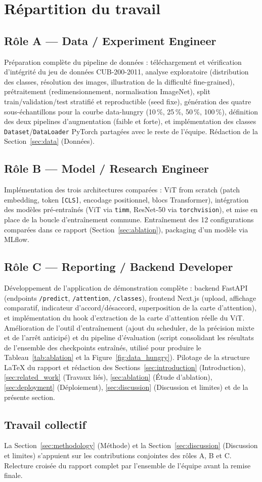 \section{Répartition du travail}
\label{sec:contributions}

\subsection{Rôle A — Data / Experiment Engineer}

Préparation complète du pipeline de données : téléchargement et
vérification d'intégrité du jeu de données CUB-200-2011, analyse
exploratoire (distribution des classes, résolution des images,
illustration de la difficulté fine-grained), prétraitement
(redimensionnement, normalisation ImageNet), split train/validation/test
stratifié et reproductible (seed fixe), génération des quatre
sous-échantillons pour la courbe data-hungry (10\,\%, 25\,\%, 50\,\%,
100\,\%), définition des deux pipelines d'augmentation (faible et
forte), et implémentation des classes \texttt{Dataset}/\texttt{DataLoader}
PyTorch partagées avec le reste de l'équipe. Rédaction de la
Section~\ref{sec:data} (Données).

\subsection{Rôle B — Model / Research Engineer}

Implémentation des trois architectures comparées : ViT from scratch
(patch embedding, token \texttt{[CLS]}, encodage positionnel, blocs
Transformer), intégration des modèles pré-entraînés (ViT via
\texttt{timm}, ResNet-50 via \texttt{torchvision}), et mise en place de
la boucle d'entraînement commune. Entraînement des 12 configurations
comparées dans ce rapport (Section~\ref{sec:ablation}), packaging d'un
modèle via MLflow.

\subsection{Rôle C — Reporting / Backend Developer}

Développement de l'application de démonstration complète : backend
FastAPI (endpoints \texttt{/predict}, \texttt{/attention},
\texttt{/classes}), frontend Next.js (upload, affichage comparatif,
indicateur d'accord/désaccord, superposition de la carte d'attention),
et implémentation du hook d'extraction de la carte d'attention réelle du
ViT. Amélioration de l'outil d'entraînement (ajout du scheduler, de la
précision mixte et de l'arrêt anticipé) et du pipeline d'évaluation
(script consolidant les résultats de l'ensemble des checkpoints
entraînés, utilisé pour produire le Tableau~\ref{tab:ablation} et la
Figure~\ref{fig:data_hungry}). Pilotage de la structure LaTeX du
rapport et rédaction des Sections~\ref{sec:introduction}
(Introduction), \ref{sec:related_work} (Travaux liés),
\ref{sec:ablation} (Étude d'ablation), \ref{sec:deployment}
(Déploiement), \ref{sec:discussion} (Discussion et limites) et de la
présente section.

\subsection{Travail collectif}

La Section~\ref{sec:methodology} (Méthode) et la
Section~\ref{sec:discussion} (Discussion et limites) s'appuient sur les
contributions conjointes des rôles A, B et C. Relecture croisée du
rapport complet par l'ensemble de l'équipe avant la remise finale.